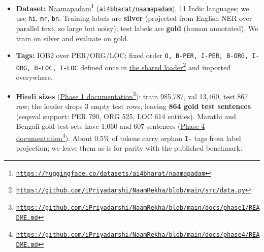 \documentclass[10pt,twoside,a4paper]{article}
\begin{document}
\begin{itemize}
\item \textbf{Dataset:} \href{https://huggingface.co/datasets/ai4bharat/naamapadam}{Naamapadam}\footnote{\href{https://huggingface.co/datasets/ai4bharat/naamapadam}{{\fontsize{8.1}{9.2}\selectfont\texttt{\mbox{https://}huggingface.\allowbreak{}co/\allowbreak{}datasets/\allowbreak{}ai4bharat/\allowbreak{}naamapadam}}}} (\href{https://huggingface.co/datasets/ai4bharat/naamapadam}{\texttt{ai4bharat/\allowbreak{}naamapadam}}), 11 Indic languages; we use \texttt{hi}, \texttt{mr}, \texttt{bn}. Training labels are \textbf{silver} (projected from English NER over parallel text, so large but noisy); test labels are \textbf{gold} (human annotated). We train on silver and evaluate on gold.
\item \textbf{Tags:} IOB2 over PER/ORG/LOC; fixed order \texttt{O, B-PER, I-PER, B-ORG, I-ORG, B-LOC, I-LOC} defined once in \href{https://github.com/iPriyadarshi/NaamRekha/blob/main/src/data.py}{the shared loader}\footnote{\href{https://github.com/iPriyadarshi/NaamRekha/blob/main/src/data.py}{{\fontsize{8.1}{9.2}\selectfont\texttt{\mbox{https://}github.\allowbreak{}com/\allowbreak{}iPriyadarshi/\allowbreak{}NaamRekha/\allowbreak{}blob/\allowbreak{}main/\allowbreak{}src/\allowbreak{}data.\allowbreak{}py}}}} and imported everywhere.
\item \textbf{Hindi sizes} (\href{https://github.com/iPriyadarshi/NaamRekha/blob/main/docs/phase1/README.md}{Phase 1 documentation}\footnote{\href{https://github.com/iPriyadarshi/NaamRekha/blob/main/docs/phase1/README.md}{{\fontsize{8.1}{9.2}\selectfont\texttt{\mbox{https://}github.\allowbreak{}com/\allowbreak{}iPriyadarshi/\allowbreak{}NaamRekha/\allowbreak{}blob/\allowbreak{}main/\allowbreak{}docs/\allowbreak{}phase1/\allowbreak{}README.\allowbreak{}md}}}}): train 985,787, val 13,460, test 867 raw; the loader drops 3 empty test rows, leaving \textbf{864 gold test sentences} (seqeval support: PER 790, ORG 525, LOC 614 entities). Marathi and Bengali gold test sets have 1,060 and 607 sentences (\href{https://github.com/iPriyadarshi/NaamRekha/blob/main/docs/phase4/README.md}{Phase 4 documentation}\footnote{\href{https://github.com/iPriyadarshi/NaamRekha/blob/main/docs/phase4/README.md}{{\fontsize{8.1}{9.2}\selectfont\texttt{\mbox{https://}github.\allowbreak{}com/\allowbreak{}iPriyadarshi/\allowbreak{}NaamRekha/\allowbreak{}blob/\allowbreak{}main/\allowbreak{}docs/\allowbreak{}phase4/\allowbreak{}README.\allowbreak{}md}}}}). About 0.5\% of tokens carry orphan \texttt{I-} tags from label projection; we leave them as-is for parity with the published benchmark.

\end{itemize}
\end{document}
